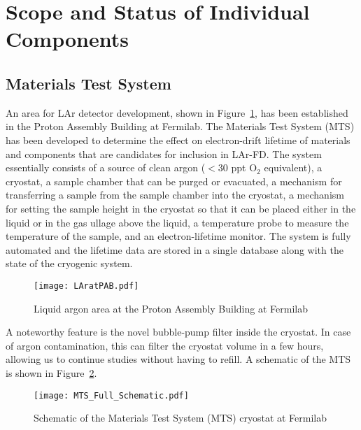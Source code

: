 \section{Scope and Status of Individual Components}

\subsection{Materials Test System}
\label{sec:mts}



An area for LAr detector development, shown in Figure~\ref{PAB}, has been established in the Proton Assembly Building at Fermilab. The Materials Test System (MTS) has been developed to determine the effect on electron-drift lifetime of materials and components that are candidates for %
inclusion in LAr-FD. The system essentially consists %
of a source of clean argon ($<30$ ppt O$_{2}$ equivalent), a cryostat, a sample chamber that can be purged or evacuated,  a mechanism for transferring a sample from the sample chamber into the cryostat, a mechanism for setting the sample height in the cryostat so that it can be placed either in the liquid or in the gas ullage above the liquid, a temperature probe to measure the temperature of the sample, and an electron-lifetime monitor. The system is fully automated and the lifetime data are stored in a single database along with the state of the cryogenic system. 

%
\begin{figure}[htpb]
\centering 
{\texttt{[image: LAratPAB.pdf]}}
\caption{Liquid argon area at the Proton Assembly Building at Fermilab}
\label{PAB}
\end{figure}
%

A noteworthy feature is the novel bubble-pump filter inside the cryostat. In case of argon contamination, this can filter the cryostat volume in a few hours, allowing us to continue studies %
 without having to refill. A schematic of the MTS is shown in Figure~\ref{MTS_Schem}.

\begin{figure}[htpb]
\centering 
{\texttt{[image: MTS\_Full\_Schematic.pdf]}}
\caption{Schematic of the Materials Test System (MTS) cryostat at Fermilab}
\label{MTS_Schem}
\end{figure}

